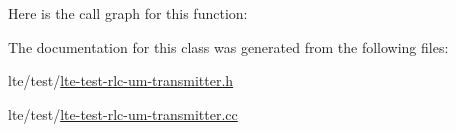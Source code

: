 Here is the call graph for this function\+:




The documentation for this class was generated from the following files\+:\begin{DoxyCompactItemize}
\item 
lte/test/\hyperlink{lte-test-rlc-um-transmitter_8h}{lte-\/test-\/rlc-\/um-\/transmitter.\+h}\item 
lte/test/\hyperlink{lte-test-rlc-um-transmitter_8cc}{lte-\/test-\/rlc-\/um-\/transmitter.\+cc}\end{DoxyCompactItemize}
